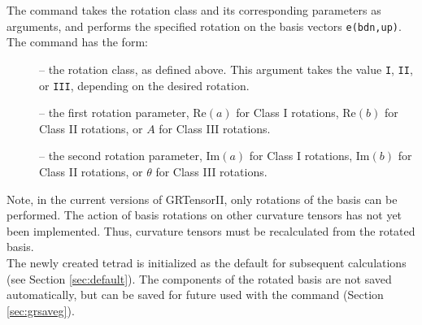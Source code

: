 \documentclass{article}
\begin{document}
The  command takes the rotation class and its corresponding
parameters as arguments, and performs the specified rotation on the basis
vectors \texttt{e(bdn,up)}. The command has the form:\\
%
\begin{cmdspec}
  \label{spec:nprotate}

  \begin{description} 
    \item[] -- the rotation class, as defined above. This
      argument takes the value \texttt{I}, \texttt{II}, or \texttt{III},
      depending on the desired rotation.

    \item[] -- the first rotation parameter,
      $\text{Re}(a)$ for Class I rotations, $\text{Re}(b)$ for Class
      II rotations, or $A$ for Class III rotations.

    \item[] -- the second rotation parameter,
      $\text{Im}(a)$ for Class I rotations, $\text{Im}(b)$ for Class
      II rotations, or $\theta$ for Class III rotations.
  \end{description}

\end{cmdspec}

Note, in the current versions of GRTensorII, only rotations of the basis
can be performed. The action of basis rotations on other curvature tensors
has not yet been implemented. Thus, curvature tensors must be recalculated
from the rotated basis.\\

The newly created tetrad is initialized as the default for subsequent
calculations (see Section \ref{sec:default}).
The components of the rotated basis are not saved automatically, but can be
saved for future used with the  command (Section 
\ref{sec:grsaveg}).
%
\end{document}
